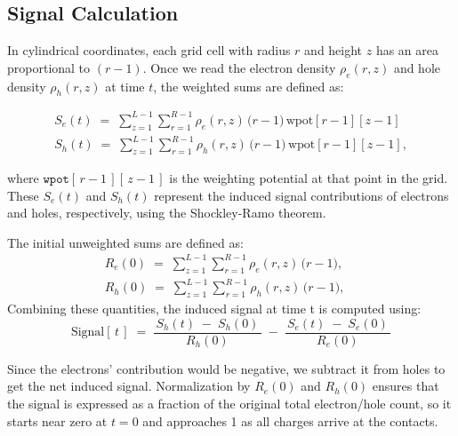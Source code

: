 \subsection{Signal Calculation}
In cylindrical coordinates, each grid cell with radius $r$ and height $z$ has an area proportional to $(r - 1)$. Once we read the electron density $\rho_e(r,z)$ and hole density $\rho_h(r,z)$ at time $t$, the weighted sums are defined as:

\begin{align}
S_e(t) \;=\; \sum_{z=1}^{L-1} \sum_{r=1}^{R-1}
   \rho_e(r,z)\,\bigl(r-1\bigr)\,\text{wpot}[r-1][z-1]\\
S_h(t) \;=\; \sum_{z=1}^{L-1} \sum_{r=1}^{R-1}
   \rho_h(r,z)\,\bigl(r-1\bigr)\,\text{wpot}[r-1][z-1],
\end{align}

\noindent
where \(\texttt{wpot}[\,r-1\,][\,z-1\,]\) is the weighting potential at that point in the grid. These $S_e(t)$ and $S_h(t)$ represent the induced signal contributions of electrons and holes, respectively, using the Shockley-Ramo theorem.

The initial unweighted sums are defined as:
\begin{align}
R_{e}(0) \;=\; \sum_{z=1}^{L-1} \sum_{r=1}^{R-1}
   \rho_e(r,z)\,\bigl(r-1\bigr), \quad \\
R_{h}(0) \;=\; \sum_{z=1}^{L-1} \sum_{r=1}^{R-1}
   \rho_h(r,z)\,\bigl(r-1\bigr), \quad
\end{align}
\noindent
Combining these quantities, the induced signal at time t is computed using:
\begin{equation}
\text{Signal}[\,t\,] 
\;=\;
  \frac{\,S_h(t)\;-\;S_h(0)\,}{\,R_{h}(0)\,}
  \;-\;
  \frac{\,S_e(t)\;-\;S_e(0)\,}{\,R_{e}(0)\,}
\label{eq:net-signal}
\end{equation}

\noindent
Since the electrons' contribution would be negative, we subtract it from holes to get the net induced signal. Normalization by $R_{e}(0)$ and $R_{h}(0)$ ensures that the signal is expressed as a fraction of the original total electron/hole count, so it starts near zero at $t=0$ and approaches 1 as all charges arrive at the contacts.


